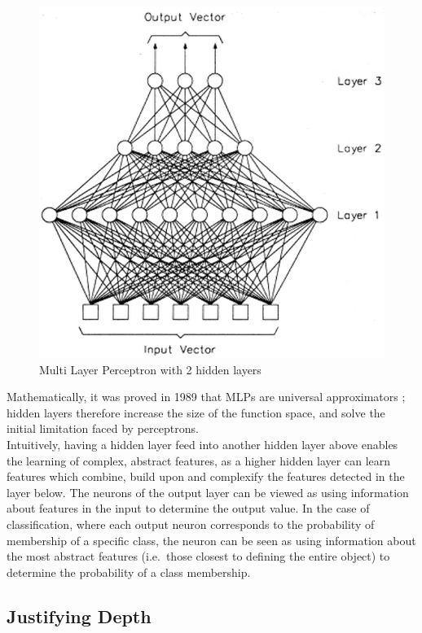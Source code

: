 \documentclass[a4paper,11pt]{article}
\begin{document}
\begin{figure}[h!]
	\centering
	\includegraphics[scale=0.4]{images/MLP.png}
	\caption{Multi Layer Perceptron with 2 hidden layers}
\end{figure}

Mathematically, it was proved in 1989 that MLPs are universal approximators \cite{MLP-univ-approx}; hidden layers therefore increase the size of the function space, and solve the initial limitation faced by perceptrons. \\

Intuitively, having a hidden layer feed into another hidden layer above enables the learning of complex, abstract features, as a higher hidden layer can learn features which combine, build upon and complexify the features detected in the layer below. The neurons of the output layer can be viewed as using information about features in the input to determine the output value. In the case of classification, where each output neuron corresponds to the probability of membership of a specific class, the neuron can be seen as using information about the most abstract features (i.e.\ those closest to defining the entire object) to determine the probability of a class membership. \\

\subsection{Justifying Depth}
\end{document}

